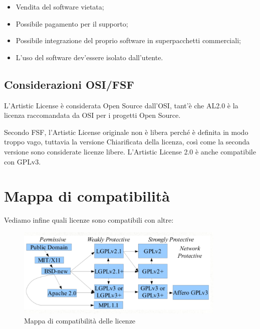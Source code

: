 \begin{itemize}

\item Vendita del software vietata;
\item Possibile pagamento per il supporto;
\item Possibile integrazione del proprio software in superpacchetti commerciali;
\item L'uso del software dev'essere isolato dall'utente.

\end{itemize}

\subsection{Considerazioni OSI/FSF}

L'Artistic License è considerata Open Source dall'OSI, tant'è che AL2.0 è la licenza raccomandata da OSI per i progetti Open Source.

Secondo FSF, l'Artistic License originale non è libera perché è definita in modo troppo vago, tuttavia la versione Chiarificata della licenza, così come la seconda versione sono considerate licenze libere. L'Artistic License 2.0 è anche compatibile con GPLv3.

\section{Mappa di compatibilità}

Vediamo infine quali licenze sono compatibili con altre:

\begin{figure}[htp]
\centering
\includegraphics[width=100mm]{images/license-compatibility.png}
\caption{Mappa di compatibilità delle licenze}
\end{figure}